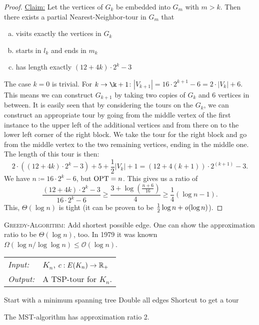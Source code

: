 \documentclass[../skript.tex]{subfiles}
\begin{document}
\begin{proof}
\underline{Claim:} Let the vertices of $G_k$ be embedded into $G_m$ with $m > k$. Then there exists a partial Nearest-Neighbor-tour in $G_m$ that
\begin{enumerate}[(a)]
\item visits exactly the vertices in $G_k$
\item starts in $l_k$ and ends in $m_k$
\item has length exactly $(12 + 4k) \cdot 2^k - 3$
\end{enumerate}
The case $k = 0$ is trivial. For $k \to \k + 1$: $|V_{k+1}| = 16 \cdot 2^{k+1} - 6 = 2 \cdot |V_k| + 6$. This means we can construct $G_{k+1}$ by taking two copies of $G_k$ and 6 vertices in between. It is easily seen that by considering the tours on the $G_k$, we can construct an appropriate tour by going from the middle vertex of the first instance to the upper left of the additional vertices and from there on to the lower left corner of the right block. We take the tour for the right block and go from the middle vertex to the two remaining vertices, ending in the middle one.
The length of this tour is then:
\[
	2 \cdot \left( (12 + 4k) \cdot 2^k - 3 \right) + 5 + \frac{1}{2} |V_k| + 1 = (12 + 4{(k+1)}) \cdot 2^{(k+1)} - 3.
\]
We have $n \coloneqq 16 \cdot 2^k - 6$, but $\operatorname{OPT} = n$. This gives us a ratio of
\[
	\frac{(12 + 4k) \cdot 2^k -3}{16 \cdot 2^k - 6} \geq \frac{3 + \log \left( \frac{n+6}{16} \right)}{4} \geq \frac{1}{4} \left( \log n - 1 \right).
\]
This, $\Theta(\log n)$ is tight (it can be proven to be $\frac{1}{2} \log n + \mathit{o}(\log n)$).
\end{proof}
\begin{remark}
\textsc{Greedy-Algorithm:} Add shortest possible edge. One can show the approximation ratio to be $\Theta(\log n)$, too. In 1979 it was known $\Omega(\log n/\log \log n) \leq \mathcal{O}(\log n)$.
\end{remark}
\begin{algorithmbox}
\begin{tabular}{@{}ll}
\textit{Input:} & $K_n$, $c : E(K_n) \to \mathbb{R}_+$\\
\textit{Output:} & A TSP-tour for $K_n$.
\end{tabular}
\end{algorithmbox}
\vspace{-7pt}
\begin{algorithm}[H]
Start with a minimum spanning tree\;
Double all edges\;
Shortcut to get a tour\;
\end{algorithm}
\vspace{-7pt}
\EndAlgorithmLine
\begin{theorem} %
\label{thm:87}
The MST-algorithm has approximation ratio 2.
\end{theorem}
\end{document}

